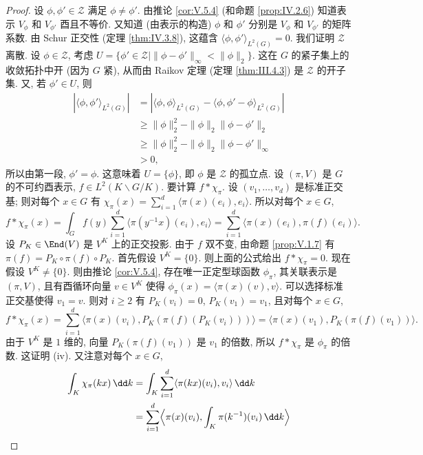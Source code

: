 \begin{proof}
设 $\phi, \phi' \in \mathcal{Z}$ 满足 $\phi \neq \phi'$. 由推论 \ref{cor:V.5.4} (和命题 \ref{prop:IV.2.6}) 知道表示 $V_{\phi}$ 和 $V_{\phi'}$ 酉且不等价. 又知道 (由表示的构造) $\phi$ 和 $\phi'$ 分别是 $V_{\phi}$ 和 $V_{\phi'}$ 的矩阵系数. 由 Schur 正交性 (定理 \ref{thm:IV.3.8}), 这蕴含 $\langle \phi, \phi' \rangle_{L^2(G)} = 0$.
我们证明 $\mathcal{Z}$ 离散. 设 $\phi \in \mathcal{Z}$, 考虑 $U = \{\phi' \in \mathcal{Z} \mid \|\phi - \phi'\|_{\infty} < \|\phi\|_2\}$. 这在 $G$ 的紧子集上的收敛拓扑中开 (因为 $G$ 紧), 从而由 Raikov 定理 (定理 \ref{thm:III.4.3}) 是 $\mathcal{Z}$ 的开子集. 又, 若 $\phi' \in U$, 则
\begin{align*}
|\langle \phi, \phi' \rangle_{L^2(G)}| &= |\langle \phi, \phi \rangle_{L^2(G)} - \langle \phi, \phi' - \phi \rangle_{L^2(G)}| \\
&\geq \|\phi\|_2^2 - \|\phi\|_2\|\phi - \phi'\|_2 \\
&\geq \|\phi\|_2^2 - \|\phi\|_2\|\phi - \phi'\|_{\infty} \\
&> 0,
\end{align*}
所以由第一段, $\phi' = \phi$. 这意味着 $U = \{\phi\}$, 即 $\phi$ 是 $\mathcal{Z}$ 的孤立点.
设 $(\pi, V)$ 是 $G$ 的不可约酉表示, $f \in L^2(K\backslash G/K)$. 要计算 $f * \chi_{\pi}$. 设 $(v_1, \ldots, v_d)$ 是标准正交基; 则对每个 $x \in G$ 有 $\chi_{\pi}(x) = \sum_{i=1}^d\langle \pi(x)(e_i), e_i \rangle$. 所以对每个 $x \in G$,
\[
f * \chi_{\pi}(x) = \int_G f(y)\sum_{i=1}^d\langle \pi(y^{-1}x)(e_i), e_i \rangle = \sum_{i=1}^d\langle \pi(x)(e_i), \pi(f)(e_i) \rangle.
\]
设 $P_K \in \End(V)$ 是 $V^K$ 上的正交投影. 由于 $f$ 双不变, 由命题 \ref{prop:V.1.7} 有 $\pi(f) = P_K \circ \pi(f) \circ P_K$. 首先假设 $V^K = \{0\}$. 则上面的公式给出 $f * \chi_{\pi} = 0$. 现在假设 $V^K \neq \{0\}$. 则由推论 \ref{cor:V.5.4}, 存在唯一正定型球函数 $\phi_{\pi}$, 其关联表示是 $(\pi, V)$, 且有酉循环向量 $v \in V^K$ 使得 $\phi_{\pi}(x) = \langle \pi(x)(v), v \rangle$. 可以选择标准正交基使得 $v_1 = v$. 则对 $i \geq 2$ 有 $P_K(v_i) = 0$, $P_K(v_1) = v_1$, 且对每个 $x \in G$,
\[
f * \chi_{\pi}(x) = \sum_{i=1}^d\langle \pi(x)(v_i), P_K(\pi(f)(P_K(v_i))) \rangle = \langle \pi(x)(v_1), P_K(\pi(f)(v_1)) \rangle.
\]
由于 $V^K$ 是 $1$ 维的, 向量 $P_K(\pi(f)(v_1))$ 是 $v_1$ 的倍数, 所以 $f * \chi_{\pi}$ 是 $\phi_{\pi}$ 的倍数. 这证明 (iv). 又注意对每个 $x \in G$,
\begin{align*}
\int_K\chi_{\pi}(kx)\,\dd k &= \int_K\sum_{i=1}^d\langle \pi(kx)(v_i), v_i \rangle\,\dd k \\
&= \sum_{i=1}^d\Bigl\langle \pi(x)(v_i), \int_K\pi(k^{-1})(v_i)\,\dd k\Bigr\rangle \\

\end{align*}
\end{proof}
